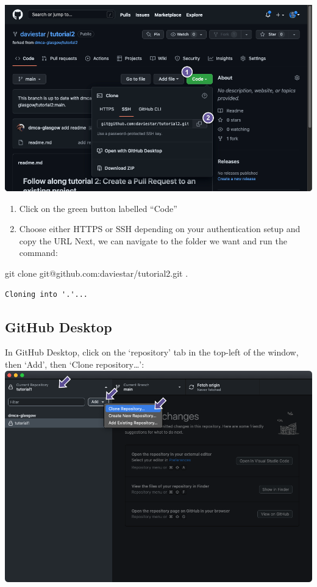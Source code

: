 \documentclass[
  letterpaper,
  DIV=11,
  numbers=noendperiod]{scrartcl}
\newenvironment{Shaded}{\begin{snugshade}}{\end{snugshade}}
\newcommand{\NormalTok}[1]{\textcolor[rgb]{0.00,0.23,0.31}{#1}}
\newcommand{\SpecialCharTok}[1]{\textcolor[rgb]{0.37,0.37,0.37}{#1}}
\providecommand{\tightlist}{%
  \setlength{\itemsep}{0pt}\setlength{\parskip}{0pt}}\usepackage{longtable,booktabs,array}
\begin{document}
\includegraphics{images/image80_1.png}

\begin{enumerate}
\def\labelenumi{\arabic{enumi}.}
\tightlist
\item
  Click on the green button labelled ``Code''
\item
  Choose either HTTPS or SSH depending on your authentication setup and
  copy the URL Next, we can navigate to the folder we want and run the
  command:
\end{enumerate}

\begin{Shaded}
\begin{Highlighting}[]
\NormalTok{git clone git}\SpecialCharTok{@}\NormalTok{github.com}\SpecialCharTok{:}\NormalTok{daviestar}\SpecialCharTok{/}\NormalTok{tutorial2.git .}
\end{Highlighting}
\end{Shaded}

\begin{verbatim}
Cloning into '.'...
\end{verbatim}

\subsection{GitHub Desktop}

In GitHub Desktop, click on the `repository' tab in the top-left of the
window, then `Add', then `Clone repository\ldots{}':
\includegraphics{images/image80.png}
\end{document}
